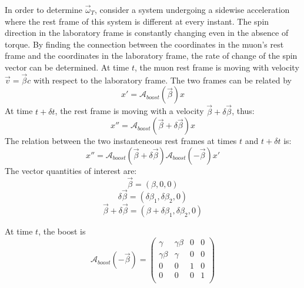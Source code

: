 \documentclass{outhesis}
\begin{document}
In order to determine $\overrightarrow{\omega}_T$, consider a system undergoing a sidewise acceleration where the rest frame of this system is different at every instant. The spin direction in the 
laboratory frame is constantly changing even in the absence of torque. By finding the connection between the coordinates in the muon's rest frame and the coordinates in the laboratory frame, 
the rate of change of the spin vector can be determined. At time $t$, the muon rest frame is moving with velocity $\overrightarrow{v} = \overrightarrow{\beta}c$ with respect to the laboratory frame. The 
two frames can be related by 
\begin{equation}
x' = \mathcal{A}_{boost}\left(\overrightarrow{\beta}\right)x
\end{equation}
At time $t+\delta t$, the rest frame is moving with a velocity $\overrightarrow{\beta} + \delta \overrightarrow{\beta}$, thus:  
\begin{equation}
x'' = \mathcal{A}_{boost}\left(\overrightarrow{\beta} +  \delta\overrightarrow{\beta}\right)x
\end{equation}
The relation between the two instanteneous rest frames at times $t$ and $t+\delta t$ is: 
\begin{equation}
x'' = \mathcal{A}_{boost}\left(\overrightarrow{\beta} +  \delta \overrightarrow{\beta}\right)\mathcal{A}_{boost}\left(-\overrightarrow{\beta}\right)x'
\end{equation}
The vector quantities of interest are:
 \[
\overrightarrow{\beta} = \left(\beta, 0, 0  \right)
\]
\[
\delta \overrightarrow{\beta} = \left(\delta \beta_1, \delta \beta_2, 0  \right)
\]
\[
\overrightarrow{\beta} + \delta \overrightarrow{\beta} = \left(\beta + \delta \beta_1, \delta \beta_2, 0    \right)
\]

At time $t$, the boost is 
\[
\mathcal{A}_{boost}\left(-\overrightarrow{\beta}\right) =
\begin{pmatrix}
\gamma & \gamma \beta & 0 & 0 \\
\gamma \beta & \gamma & 0 & 0 \\
0 & 0 & 1 & 0 \\
0 & 0 & 0 & 1 \\
\end{pmatrix}
\]
\end{document}
